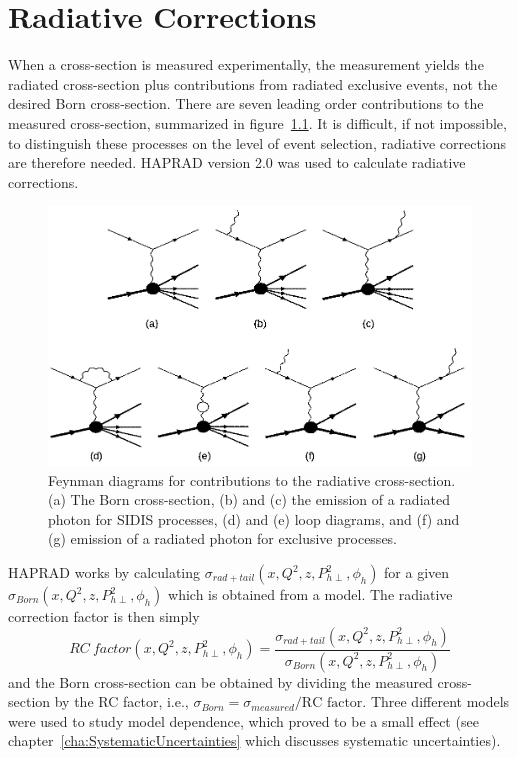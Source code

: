 \chapter{Radiative Corrections}
\label{cha:RadiativeCorrections}
%
When a cross-section is measured experimentally, the measurement yields the radiated cross-section plus contributions from radiated exclusive events, not the desired Born cross-section.
There are seven leading order contributions to the measured cross-section, summarized in figure~\ref{fig:radiatedFeynmanDiagrams}.
It is difficult, if not impossible, to distinguish these processes on the level of event selection, radiative corrections are therefore needed.
HAPRAD version 2.0 \cite{Akushevich99}\cite{Akushevich09} was used to calculate radiative corrections.
%
\begin{figure}[htp]
\centering
\includegraphics[width=5in]{figures/radiatedFeynmanDiagrams_BandW.png}
\caption{Feynman diagrams for contributions to the radiative cross-section. (a) The Born cross-section, (b) and (c) the emission of a radiated photon for SIDIS processes, (d) and (e) loop diagrams, and (f) and (g) emission of a radiated photon for exclusive processes.}
\label{fig:radiatedFeynmanDiagrams}
\end{figure}

HAPRAD works by calculating $\sigma_{rad+tail} \left( x, Q^2, z, P_{h\perp}^2, \phi_h \right)$ for a given \allowbreak $\sigma_{Born} \left( x, Q^2, z, P_{h\perp}^2, \phi_h \right)$ which is obtained from a model.
The radiative correction factor is then simply
\begin{equation}
\label{eq:RCfactor}
RC\ factor \left( x, Q^2, z, P_{h\perp}^2, \phi_h \right) = \frac{\sigma_{rad+tail} \left( x, Q^2, z, P_{h\perp}^2, \phi_h \right)}{\sigma_{Born} \left( x, Q^2, z, P_{h\perp}^2, \phi_h \right)}
\end{equation}
and the Born cross-section can be obtained by dividing the measured cross-section by the RC factor, i.e., $\sigma_{Born} = \sigma_{measured}/\text{RC factor}$.
Three different models were used to study model dependence, which proved to be a small effect (see chapter~\ref{cha:SystematicUncertainties} which discusses systematic uncertainties).

